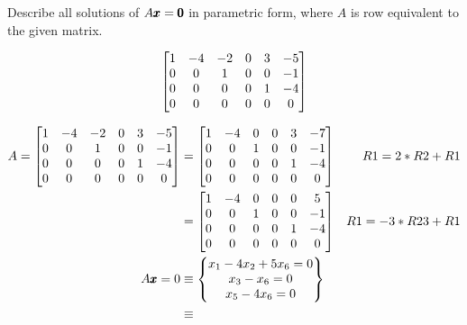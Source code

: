 \documentclass{../mathhomework}
\newenvironment{Mat}{\begin{bmatrix}}{\end{bmatrix}}
\begin{document}
\pagebreak
\begin{problem}[1.5\#11]
    Describe all solutions of $A\pmb{x} = \pmb{0}$ in parametric form, where $A$ is row equivalent to the given matrix.

    \begin{equation*}
        \begin{Mat}
            1 & -4 & -2 & 0 & 3 & -5 \\
            0 & 0 & 1 & 0 & 0 & -1 \\
            0 & 0 & 0 & 0 & 1 & -4 \\
            0 & 0 & 0 & 0 & 0 & 0
        \end{Mat}
    \end{equation*}

    \begin{solution}
        \begin{align*}
            A = \begin{Mat}
                1 & -4 & -2 & 0 & 3 & -5 \\
                0 & 0 & 1 & 0 & 0 & -1 \\
                0 & 0 & 0 & 0 & 1 & -4 \\
                0 & 0 & 0 & 0 & 0 & 0
            \end{Mat} & =
            \begin{Mat}
                1 & -4 & 0 & 0 & 3 & -7 \\
                0 & 0 & 1 & 0 & 0 & -1 \\
                0 & 0 & 0 & 0 & 1 & -4 \\
                0 & 0 & 0 & 0 & 0 & 0
            \end{Mat} & R1 = 2 * R2 + R1 \\ & =
            \begin{Mat}
                1 & -4 & 0 & 0 & 0 & 5 \\
                0 & 0 & 1 & 0 & 0 & -1 \\
                0 & 0 & 0 & 0 & 1 & -4 \\
                0 & 0 & 0 & 0 & 0 & 0
            \end{Mat} & R1 = -3 * R23+ R1 \\
            A\Vect{x} = 0 & \equiv 
            \begin{Bmatrix}
                x_1 - 4x_2 + 5x_6 = 0 \\
                x_3 - x_6 = 0 \\
                x_5 - 4x_6 = 0
            \end{Bmatrix} \\ & \equiv

\end{align*}
\end{solution}
\end{problem}
\end{document}
